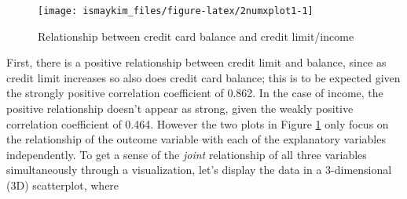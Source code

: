 \documentclass[12pt,]{krantz}
\makeatletter
\newenvironment{Shaded}{\begin{snugshade}}{\end{snugshade}}
\newcommand{\KeywordTok}[1]{\textcolor[rgb]{0.27,0.27,0.27}{\textbf{#1}}}
\newcommand{\DataTypeTok}[1]{\textcolor[rgb]{0.27,0.27,0.27}{#1}}
\newcommand{\StringTok}[1]{\textcolor[rgb]{0.5,0.5,0.5}{#1}}
\newcommand{\OtherTok}[1]{\textcolor[rgb]{0.37,0.37,0.37}{#1}}
\newcommand{\OperatorTok}[1]{\textcolor[rgb]{0.43,0.43,0.43}{\textbf{#1}}}
\newcommand{\NormalTok}[1]{#1}
\newenvironment{kframe}{%
\medskip{}
\setlength{\fboxsep}{.8em}
 \def\at@end@of@kframe{}%
 \ifinner\ifhmode%
  \def\at@end@of@kframe{\end{minipage}}%
  \begin{minipage}{\columnwidth}%
 \fi\fi%
 \def\FrameCommand##1{\hskip\@totalleftmargin \hskip-\fboxsep
 \colorbox{shadecolor}{##1}\hskip-\fboxsep
     \hskip-\linewidth \hskip-\@totalleftmargin \hskip\columnwidth}%
 \MakeFramed {\advance\hsize-\width
   \@totalleftmargin\z@ \linewidth\hsize
   \@setminipage}}%
 {\par\unskip\endMakeFramed%
 \at@end@of@kframe}
\renewenvironment{Shaded}{\begin{kframe}}{\end{kframe}}
\theoremstyle{definition}
\theoremstyle{definition}
\theoremstyle{definition}
\theoremstyle{remark}
\makeatother
\begin{document}
\begin{Shaded}
\end{Shaded}

\begin{figure}

{\centering \texttt{[image: ismaykim\_files/figure-latex/2numxplot1-1]} 

}

\caption{Relationship between credit card balance and credit limit/income}\label{fig:2numxplot1}
\end{figure}

First, there is a positive relationship between credit limit and
balance, since as credit limit increases so also does credit card
balance; this is to be expected given the strongly positive correlation
coefficient of 0.862. In the case of income, the positive relationship
doesn't appear as strong, given the weakly positive correlation
coefficient of 0.464. However the two plots in Figure
\ref{fig:2numxplot1} only focus on the relationship of the outcome
variable with each of the explanatory variables independently. To get a
sense of the \emph{joint} relationship of all three variables
simultaneously through a visualization, let's display the data in a
3-dimensional (3D) scatterplot, where
\end{document}
